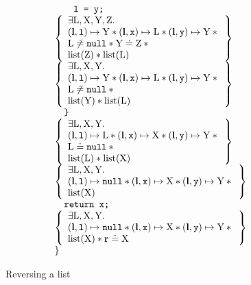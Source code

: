 \documentclass{article}
\begin{document}
{\begin{figure}
{\[\begin{array}{l}
        \qquad \js{l = y;}\\
        \left\{\begin{array}{l}
                \exists \V{L},\V{X},\V{Y},\V{Z}\st\\
                (\ls,\js{l})\pointsto\V{Y}\sep(\ls,\js{x})\pointsto\V{L} \sep (\ls,\js{y})\pointsto\V{Y}\sep{}\\
                \V{L}\not\doteq\nil\sep\V{Y}\doteq\V{Z}\sep{}\\
                \text{list}(\V{Z}) \sep \text{list}(\V{L})
        \end{array}\right\}\\
        \left\{\begin{array}{l}
                \exists \V{L},\V{X},\V{Y}\st\\
                (\ls,\js{l})\pointsto\V{Y}\sep(\ls,\js{x})\pointsto\V{L} \sep (\ls,\js{y})\pointsto\V{Y}\sep{}\\
                \V{L}\not\doteq\nil\sep{}\\
                \text{list}(\V{Y}) \sep \text{list}(\V{L})
        \end{array}\right\}\\
        \quad \js{\}}\\
        \left\{\begin{array}{l}
                \exists \V{L},\V{X},\V{Y}\st\\
                (\ls,\js{l})\pointsto\V{L}\sep(\ls,\js{x})\pointsto\V{X} \sep (\ls,\js{y})\pointsto\V{Y}\sep{}\\
                \V{L}\doteq\nil\sep{}\\
                \text{list}(\V{L}) \sep \text{list}(\V{X})
        \end{array}\right\}\\
        \left\{\begin{array}{l}
                \exists \V{L},\V{X},\V{Y}\st\\
                (\ls,\js{l})\pointsto\nil\sep(\ls,\js{x})\pointsto\V{X} \sep (\ls,\js{y})\pointsto\V{Y}\sep{}\\
                \text{list}(\V{X})
        \end{array}\right\}\\
        \quad \js{return x;}\\
        \left\{\begin{array}{ll}
                \exists \V{L},\V{X},\V{Y}\st\\
                (\ls,\js{l})\pointsto\nil\sep(\ls,\js{x})\pointsto\V{X} \sep (\ls,\js{y})\pointsto\V{Y}\sep{}\\
                \text{list}(\V{X})\sep\rv\doteq\V{X}
        \end{array}\right\}\\
        \}\\
\end{array}
\]}
\caption{Reversing a list}
\label{fig:revlist}
\end{figure}
}
\end{document}
